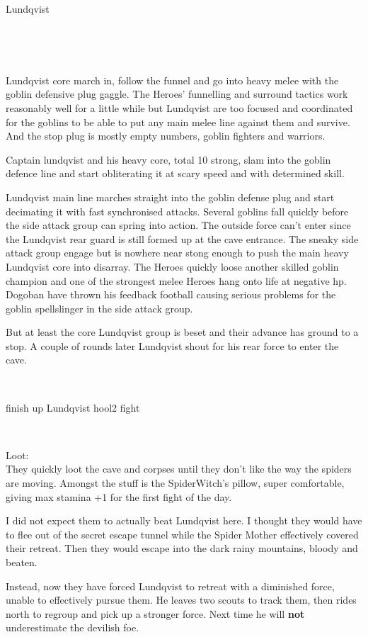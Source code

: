 Lundqvist 







\

\vspace{40mm}

\


Lundqvist core march in, follow the funnel and go into heavy melee with the goblin defensive plug gaggle. The Heroes' funnelling and surround tactics work reasonably well for a little while but Lundqvist are too focused and coordinated for the goblins to be able to put any main melee line against them and survive. And the stop plug is mostly empty numbers, goblin fighters and warriors.

Captain lundqvist and his heavy core, total 10 strong, slam into the goblin defence line and start obliterating it at scary speed and with determined skill.


Lundqvist main line marches straight into the goblin defense plug and start decimating it with fast synchronised attacks. Several goblins fall quickly before the side attack group can spring into action. The outside force can't enter since the Lundqvist rear guard is still formed up at the cave entrance.
The sneaky side attack group engage but is nowhere near stong enough to push the main heavy Lundqvist core into disarray. The Heroes quickly loose another skilled goblin champion and one of the strongest melee Heroes hang onto life at negative hp. Dogoban have thrown his feedback football causing serious problems for the goblin spellslinger in the side attack group.

But at least the core Lundqvist group is beset and their advance has ground to a stop. A couple of rounds later Lundqvist shout for his rear force to enter the cave.





\

\todo finish up Lundqvist hool2 fight

\

Loot:\\
They quickly loot the cave and corpses until they don't like the way the spiders are moving. Amongst the stuff is the SpiderWitch's pillow, super comfortable, giving max stamina +1 for the first fight of the day.


\begin{readoutloud}
I did not expect them to actually beat Lundqvist here. I thought they would have to flee out of the secret escape tunnel while the Spider Mother effectively covered their retreat. Then they would escape into the dark rainy mountains, bloody and beaten.

Instead, now they have forced Lundqvist to retreat with a diminished force, unable to effectively pursue them. He leaves two scouts to track them, then rides north to regroup and pick up a stronger force. Next time he will \textbf{not} underestimate the devilish foe.
\end{readoutloud}


